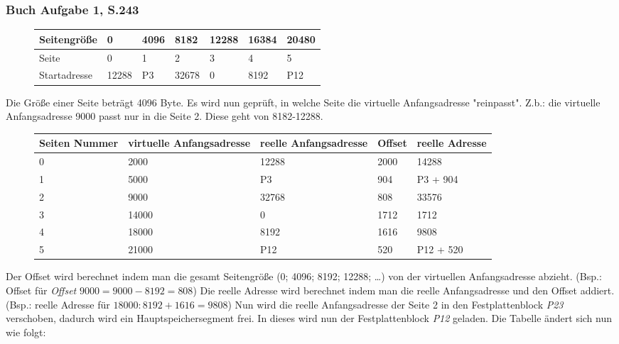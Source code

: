 \documentclass[12pt,a4paper]{article}
\begin{document}
\subsubsection{Buch Aufgabe 1, S.243}
\begin{figure} [h]
\begin{tabularx}{17cm}{| l | X | X | X | X | X | X | }
\hline
\small{Seitengröße} & 0 & 4096 & 8182 & 12288 & 16384 & 20480 \\
\hline
\small{Seite} & 0&1&2&3&4&5\\
\hline
\small{Startadresse} & 12288 & P3 & 32678 & 0 & 8192 & P12 \\
\hline
\end{tabularx}
\end{figure}
\noindent Die Größe einer Seite beträgt 4096 Byte. Es wird nun geprüft, in welche Seite die virtuelle Anfangsadresse "reinpasst". Z.b.: die virtuelle Anfangsadresse 9000 passt nur in die Seite 2. Diese geht von 8182-12288.
\begin{figure}[h]
\begin{tabularx}{17cm}{| X | X | X | X | X |}
\hline 
\small{Seiten Nummer} & \small{virtuelle Anfangsadresse} & \small{reelle Anfangsadresse} & \small{Offset} & \small{reelle Adresse} \\
\hline
0 & 2000 & 12288 & 2000 & 14288 \\
\hline
1 & 5000 & P3 & 904 & P3 + 904 \\
\hline
2 & 9000 & 32768 & 808 & 33576 \\
\hline
3 & 14000 & 0 & 1712 & 1712 \\
\hline
4 & 18000 & 8192 & 1616 & 9808 \\
\hline
5 & 21000 & P12 & 520 & P12 + 520 \\
\hline
\end{tabularx}
\end{figure}
\noindent Der Offset wird berechnet indem man die gesamt Seitengröße (0; 4096; 8192; 12288; \dots) von der virtuellen Anfangsadresse abzieht. (Bsp.: Offset für \textit{Offset} $9000=9000-8192 = 808$)\newline
Die reelle Adresse wird berechnet indem man die reelle Anfangsadresse und den Offset \newline addiert. (Bsp.: reelle Adresse für $18000: 8192+1616=9808$)
\newline
\newline
Nun wird die reelle Anfangsadresse der Seite 2 in den Festplattenblock \textit{P23} verschoben, dadurch wird ein Hauptspeichersegment frei. In dieses wird nun der Festplattenblock \textit{P12} geladen. Die Tabelle ändert sich nun wie folgt:\newpage
\end{document}
